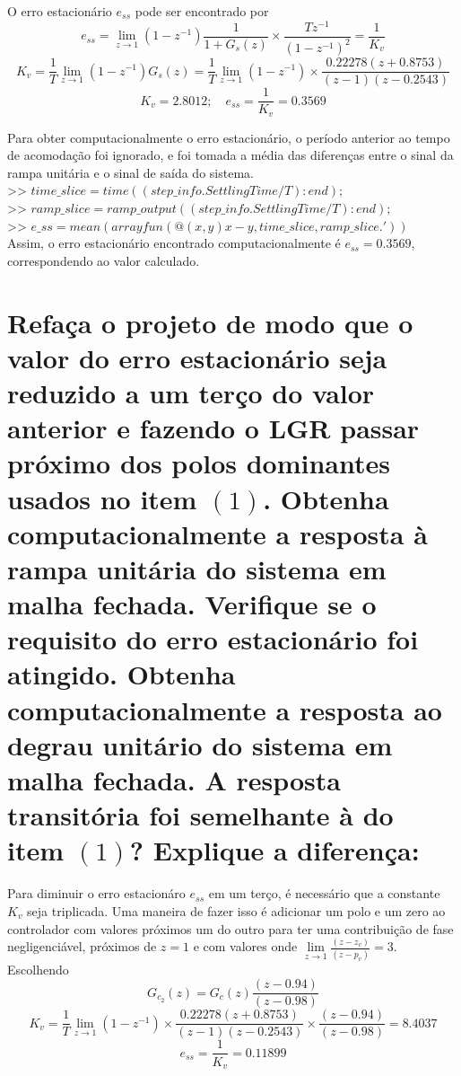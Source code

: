 \documentclass{article}
\begin{document}
{        {O erro estacionário $e_{ss}$ pode ser encontrado por}\\
        \[ e_{ss} = \lim\limits_{z \to 1} (1 - z^{-1}) \frac{1}{1 + G_s(z)}
                \times \frac{Tz^{-1}}{(1- z^{-1})^2 }
                = \frac{1}{K_v} \]
        \[ K_v = \frac{1}{T} \lim\limits_{z \to 1} (1-z^{-1}) G_s(z)
            =   \frac{1}{T} \lim\limits_{z \to 1} (1-z^{-1})
            \times \frac{0.22278(z+0.8753)}{(z-1)(z - 0.2543)} \]
        \[ K_v = 2.8012; \quad e_{ss} = \frac{1}{K_v} = 0.3569 \]

        {Para obter computacionalmente o erro estacionário, o período anterior
            ao tempo de acomodação foi ignorado, e foi tomada a média das
            diferenças entre o sinal da rampa unitária e o sinal de saída do sistema.\\
        >> $ time\_slice = time((step\_info.SettlingTime/T):end); $\\
        >> $ ramp\_slice = ramp\_output((step\_info.SettlingTime/T):end); $\\
        >> $ e\_ss = mean(arrayfun(@(x,y) x - y, time\_slice, ramp\_slice.')) $ }\\

        {Assim, o erro estacionário encontrado computacionalmente é
            $e_{ss} = 0.3569$, correspondendo ao valor calculado.}

    \section{Refaça o projeto de modo que o valor do erro estacionário seja
        reduzido a um terço do valor anterior e fazendo o LGR passar próximo dos
        polos dominantes usados no item $(1)$. Obtenha computacionalmente a
        resposta à rampa unitária do sistema em malha fechada. Verifique se o
        requisito do erro estacionário foi atingido. Obtenha computacionalmente
        a resposta ao degrau unitário do sistema em malha fechada. A resposta
        transitória foi semelhante à do item $(1)$? Explique a diferença:}

        {Para diminuir o erro estacionáro $e_{ss}$ em um terço, é necessário que
            a constante $K_v$ seja triplicada. Uma maneira de fazer isso é
            adicionar um polo e um zero ao controlador com valores próximos um
            do outro para ter uma contribuição de fase negligenciável, próximos
            de $z = 1$ e com valores onde $\lim\limits_{z \to 1}
            \frac{(z - z_v)}{(z - p_v)} = 3$. Escolhendo}
        \[ G_{c_2}(z) = G_c(z) \frac{(z - 0.94)}{(z - 0.98)} \]
        \[ K_v = \frac{1}{T} \lim\limits_{z \to 1} (1-z^{-1})
            \times \frac{0.22278(z+0.8753)}{(z-1)(z - 0.2543)}
            \times \frac{(z - 0.94)}{(z - 0.98)}
            = 8.4037\]
        \[ e_{ss} = \frac{1}{K_v} = 0.11899 \]\\

}
\end{document}
